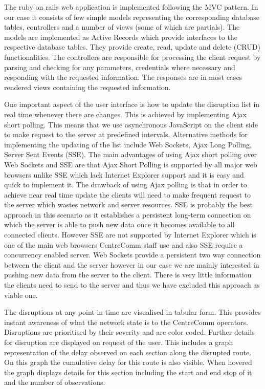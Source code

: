 The ruby on rails web application is implemented following the MVC pattern. In our case it consists of few simple models representing the corresponding database tables, controllers and a number of views (some of which are partials). The models are implemented as Active Records which provide interfaces to the respective database tables. They provide create, read, update and delete (CRUD) functionalities. The controllers are responsible for processing the client request by parsing and checking for any parameters, credentials where necessary and responding with the requested information. The responses are in most cases rendered views containing the requested information.

One important aspect of the user interface is how to update the disruption list in real time whenever there are changes. This is achieved by implementing Ajax short polling. This means that we use asynchronous JavaScript on the client side to make request to the server at predefined intervals. Alternative methods for implementing the updating of the list include Web Sockets, Ajax Long Polling, Server Sent Events (SSE). The main advantages of using Ajax short polling over Web Sockets and SSE are that Ajax Short Polling is supported by all major web browsers unlike SSE which lack Internet Explorer support and it is easy and quick to implement it. The drawback of using Ajax polling is that in order to achieve near real time update the clients will need to make frequent request to the server which wastes network and server resources. SSE is probably the best approach in this scenario as it establishes a persistent long-term connection on which the server is able to push new data once it becomes available to all connected clients. However SSE are not supported by Internet Explorer which is one of the main web browsers CentreComm staff use and also SSE require a concurrency enabled server. Web Sockets provide a persistent two way connection between the client and the server however in our case we are mainly interested in pushing new data from the server to the client. There is very little information the clients need to send to the server and thus we have excluded this approach as viable one.

The disruptions at any point in time are visualised in tabular form. This provides instant awareness of what the network state is to the CentreComm operators. Disruptions are prioritised by their severity and are color coded. Further details for disruption are displayed on request of the user. This includes a graph representation of the delay observed on each section along the disrupted route. On this graph the cumulative delay for this route is also visible. When hovered the graph displays details for this section including the start and end stop of it and the number of observations.

